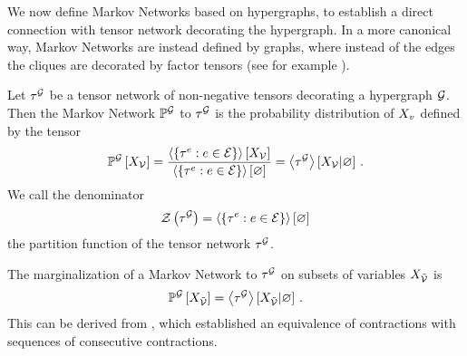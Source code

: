 
We now define Markov Networks based on hypergraphs, to establish a direct connection with tensor network decorating the hypergraph.
In a more canonical way, Markov Networks are instead defined by graphs, where instead of the edges the cliques are decorated by factor tensors (see for example \cite{koller_probabilistic_2009}).

\begin{definition}
    \label{def:markovNetwork}
    Let $\tau^{\mathcal{G}}$ be a tensor network of non-negative tensors decorating a hypergraph $\mathcal{G}$.
    Then the Markov Network $\mathbb{P}^{\mathcal{G}}$ to $\tau^{\mathcal{G}}$ is the probability distribution of $X_{v}$ defined by the tensor
    \begin{align*}
        \mathbb{P}^{\mathcal{G}}\left[X_{\mathcal{V}}\right] = \frac{
            \left\langle \{\tau^{e} : e \in \mathcal{E}\}\right\rangle \left[ X_{\mathcal{V}} \right]
        }{
            \left\langle \{\tau^{e} : e \in \mathcal{E}\}\right\rangle \left[ \varnothing \right]
        } = \left\langle \tau^{\mathcal{G}}\right\rangle \left[ X_{\mathcal{V}} | \varnothing \right] \, .
    \end{align*}
    We call the denominator
    \begin{align*}
        \mathcal{Z}\left(\tau^{\mathcal{G}}\right) = \left\langle \{\tau^{e} : e \in \mathcal{E}\}\right\rangle \left[ \varnothing \right]
    \end{align*}
    the partition function of the tensor network $\tau^{\mathcal{G}}$.
\end{definition}

The marginalization of a Markov Network to $\tau^{\mathcal{G}}$ on subsets of variables $X_{\tilde{\mathcal{V}}}$ is
\begin{align*}
    \mathbb{P}^{\mathcal{G}}\left[X_{\tilde{\mathcal{V}}}\right]
    = \left\langle \tau^{\mathcal{G}}\right\rangle \left[ X_{\tilde{\mathcal{V}}} | \varnothing \right] \, .
\end{align*}
This can be derived from , which established an equivalence of contractions with sequences of consecutive contractions.

